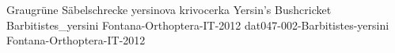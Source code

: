 {Graugr\"une S\"abelschrecke} %
{yersinova krivocerka} %
{Yersin's Bushcricket} %
{Barbitistes_yersini} %
{Fontana-Orthoptera-IT-2012}%
{} %
{\url{}} %
{} %
{} %
{dat047-002-Barbitistes-yersini} %
{Fontana-Orthoptera-IT-2012}%
